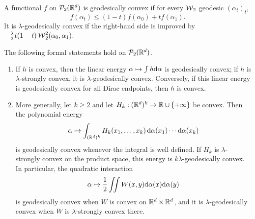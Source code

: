 \begin{defn}\label{def-geodesic-convexity}
	A functional $f$ on $\mathcal{P}_2(\mathbb{R}^d)$ is geodesically convex if for every $\operatorname{\mathcal{W}}_2$ geodesic $(\alpha_t)_t$,
	\[
		f(\alpha_t)\leq (1-t)f(\alpha_0)+t f(\alpha_1).
	\]
	It is $\lambda$-geodesically convex if the right-hand side is improved by $-\frac{\lambda}{2}t(1-t)\operatorname{\mathcal{W}}_2^2(\alpha_0,\alpha_1)$.
\end{defn}

\begin{prop}\label{prop-basic-geodesic-convexity}
	The following formal statements hold on $\mathcal{P}_2(\mathbb{R}^d)$.
	\begin{enumerate}
		\item If $h$ is convex, then the linear energy $\alpha\mapsto\int h\mathrm{d}\alpha$ is geodesically convex; if $h$ is $\lambda$-strongly convex, it is $\lambda$-geodesically convex. Conversely, if this linear energy is geodesically convex for all Dirac endpoints, then $h$ is convex.
		\item More generally, let \(k\geq2\) and let \(H_k:(\mathbb{R}^d)^k\to\mathbb{R}\cup\{+\infty\}\) be convex. Then the polynomial energy
		\[
			\alpha\mapsto \int_{(\mathbb{R}^d)^k} H_k(x_1,\ldots,x_k)\,\mathrm{d}\alpha(x_1)\cdots\mathrm{d}\alpha(x_k)
		\]
		is geodesically convex whenever the integral is well defined. If $H_k$ is $\lambda$-strongly convex on the product space, this energy is $k\lambda$-geodesically convex. In particular, the quadratic interaction
		\[
			\alpha\mapsto\frac12\iint W(x,y)\mathrm{d}\alpha(x)\mathrm{d}\alpha(y)
		\]
		is geodesically convex when \(W\) is convex on \(\mathbb{R}^d\times\mathbb{R}^d\), and it is $\lambda$-geodesically convex when $W$ is $\lambda$-strongly convex there.
	\end{enumerate}
\end{prop}
